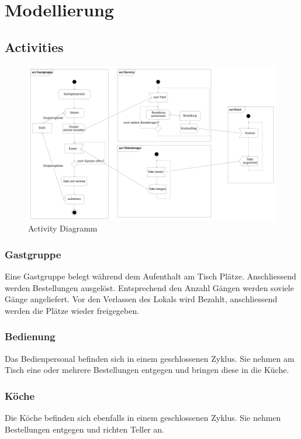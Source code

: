 \documentclass[ngerman,a4paper,12pt]{scrreprt}
\begin{document}
\chapter{Modellierung}
	\section{Activities}
		\begin{figure}[H]
			\centering
				\includegraphics[width=1\textwidth]{img/activityDiagramm-v1.png}
				\caption[Activity Diagramm]{Activity Diagramm}
				\label{activityDiagramm}
		\end{figure}
		
		\subsection{Gastgruppe}
		Eine Gastgruppe belegt während dem Aufenthalt am Tisch Plätze. Anschliessend werden Bestellungen ausgelöst.
		Entsprechend den Anzahl Gängen werden soviele Gänge angeliefert.
		Vor den Verlassen des Lokals wird Bezahlt, anschliessend werden die Plätze wieder freigegeben.
		
		\subsection{Bedienung}
		Das Bedienpersonal befinden sich in einem geschlossenen Zyklus. Sie nehmen am Tisch eine oder mehrere Bestellungen entgegen und bringen diese in die Küche.
		
		\subsection{Köche}
		Die Köche befinden sich ebenfalls in einem geschlossenen Zyklus. Sie nehmen Bestellungen entgegen und richten Teller an.
		
\end{document}
